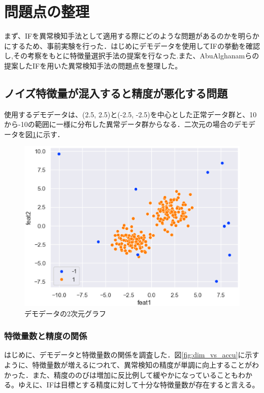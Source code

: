 \documentclass{css}
\begin{document}
\section{問題点の整理}
まず、IFを異常検知手法として適用する際にどのような問題があるのかを明らかにするため、事前実験を行った．はじめにデモデータを使用してIFの挙動を確認し,その考察をもとに特徴量選択手法の提案を行なった.また、AbuAlghanamらの提案したIFを用いた異常検知手法\cite{AbuAlghanam2023-sx}の問題点を整理した。

\subsection{ノイズ特徴量が混入すると精度が悪化する問題}
使用するデモデータは、(2.5, 2.5)と(-2.5, -2.5)を中心とした正常データ群と、10から-10の範囲に一様に分布した異常データ群からなる．二次元の場合のデモデータを図\ref{fig:demodata}に示す．

\begin{figure}[ht]
    \centering
    \includegraphics[width=0.9\linewidth]{pictures/eps/demodata.eps}
    \caption{デモデータの2次元グラフ}
    \label{fig:demodata}
\end{figure}

\subsubsection{特徴量数と精度の関係}
はじめに、デモデータと特徴量数の関係を調査した．図\ref{fig:dim_vs_accu}に示すように、特徴量数が増えるにつれて、異常検知の精度が単調に向上することがわかった．また、精度ののびは増加に反比例して緩やかになっていることもわかる。ゆえに、IFは目標とする精度に対して十分な特徴量数が存在すると言える。
\end{document}
